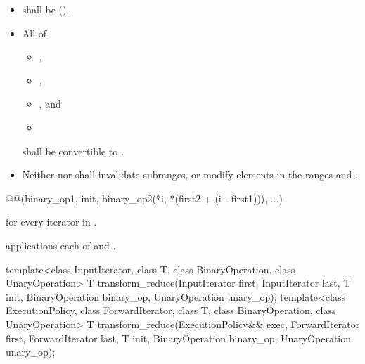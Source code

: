 \begin{itemdescr}
\pnum
\requires
\begin{itemize}
\item {} shall be  ().
\item All of
\begin{itemize}
\item {},
\item {},
\item {}, and
\item {}
\end{itemize}
shall be convertible to .
\item Neither  nor  shall invalidate
subranges, or modify elements in the ranges  and
.
\end{itemize}

\pnum
\returns
\begin{codeblock}
@@(binary_op1, init, binary_op2(*i, *(first2 + (i - first1))), ...)
\end{codeblock}
for every iterator  in .

\pnum
\complexity {} applications each of  and
.
\end{itemdescr}

%
\begin{itemdecl}
template<class InputIterator, class T,
         class BinaryOperation, class UnaryOperation>
  T transform_reduce(InputIterator first, InputIterator last, T init,
                     BinaryOperation binary_op, UnaryOperation unary_op);
template<class ExecutionPolicy,
         class ForwardIterator, class T,
         class BinaryOperation, class UnaryOperation>
  T transform_reduce(ExecutionPolicy&& exec,
                     ForwardIterator first, ForwardIterator last,
                     T init, BinaryOperation binary_op, UnaryOperation unary_op);
\end{itemdecl}

